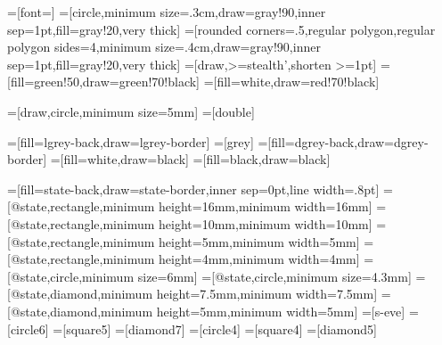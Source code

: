 \usepackage{xspace}
\usetikzlibrary{arrows}
\usetikzlibrary{automata}
\usetikzlibrary{shapes,snakes}
\usetikzlibrary{calc}
\usetikzlibrary{patterns}
\usetikzlibrary{shapes.geometric}
\usetikzlibrary{positioning}
=[font=\small]
=[circle,minimum size=.3cm,draw=gray!90,inner sep=1pt,fill=gray!20,very thick]
=[rounded corners=.5,regular polygon,regular polygon
  sides=4,minimum size=.4cm,draw=gray!90,inner sep=1pt,fill=gray!20,very thick]
=[draw,>=stealth',shorten >=1pt]
=[fill=green!50,draw=green!70!black]
=[fill=white,draw=red!70!black]

=[draw,circle,minimum size=5mm]
=[double]




=[fill=lgrey-back,draw=lgrey-border]
=[grey]
=[fill=dgrey-back,draw=dgrey-border]
=[fill=white,draw=black]
=[fill=black,draw=black]

=[fill=state-back,draw=state-border,inner sep=0pt,line width=.8pt]
=[@state,rectangle,minimum height=16mm,minimum width=16mm]
=[@state,rectangle,minimum height=10mm,minimum width=10mm]
=[@state,rectangle,minimum height=5mm,minimum width=5mm]
=[@state,rectangle,minimum height=4mm,minimum width=4mm]
=[@state,circle,minimum size=6mm]
=[@state,circle,minimum size=4.3mm]
=[@state,diamond,minimum height=7.5mm,minimum width=7.5mm]
=[@state,diamond,minimum height=5mm,minimum width=5mm]
=[s-eve]
=[circle6]
=[square5]
=[diamond7]
=[circle4]
=[square4]
=[diamond5]
\tikzset{node distance=2.5cm}

